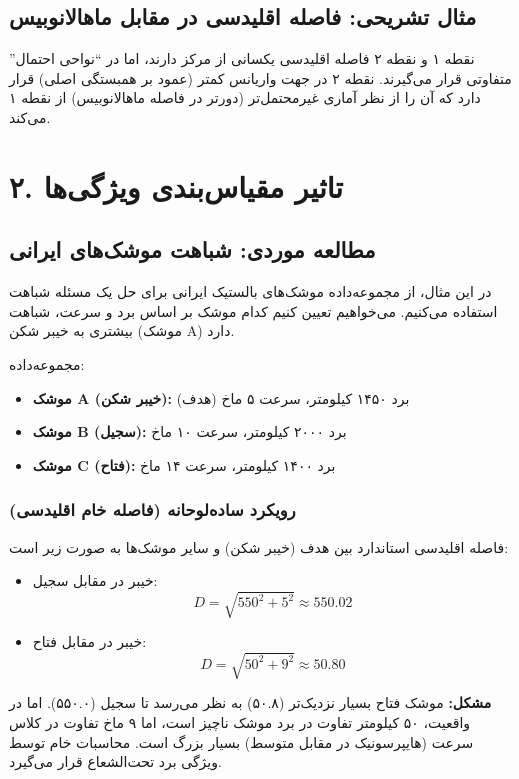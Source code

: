 \documentclass{article}
\begin{document}
\subsection*{مثال تشریحی: فاصله اقلیدسی در مقابل ماهالانوبیس}
نقطه ۱ و نقطه ۲ فاصله اقلیدسی یکسانی از مرکز دارند، اما در ``نواحی احتمال'' متفاوتی قرار می‌گیرند. نقطه ۲ در جهت واریانس کمتر (عمود بر همبستگی اصلی) قرار دارد که آن را از نظر آماری غیرمحتمل‌تر (دورتر در فاصله ماهالانوبیس) از نقطه ۱ می‌کند.

\section*{۲. تاثیر مقیاس‌بندی ویژگی‌ها}
\subsection*{مطالعه موردی: شباهت موشک‌های ایرانی}
در این مثال، از مجموعه‌داده موشک‌های بالستیک ایرانی برای حل یک مسئله شباهت استفاده می‌کنیم. می‌خواهیم تعیین کنیم کدام موشک بر اساس برد و سرعت، شباهت بیشتری به خیبر شکن (موشک A) دارد.

مجموعه‌داده:
\begin{itemize}
    \item \textbf{موشک A (خیبر شکن):} برد ۱۴۵۰ کیلومتر، سرعت ۵ ماخ (هدف)
    \item \textbf{موشک B (سجیل):} برد ۲۰۰۰ کیلومتر، سرعت ۱۰ ماخ
    \item \textbf{موشک C (فتاح):} برد ۱۴۰۰ کیلومتر، سرعت ۱۴ ماخ
\end{itemize}

\subsubsection*{رویکرد ساده‌لوحانه (فاصله خام اقلیدسی)}
فاصله اقلیدسی استاندارد بین هدف (خیبر شکن) و سایر موشک‌ها به صورت زیر است:
\begin{itemize}
    \item خیبر در مقابل سجیل:
    \[
    D = \sqrt{550^2 + 5^2} \approx 550.02
    \]
    \item خیبر در مقابل فتاح:
    \[
    D = \sqrt{50^2 + 9^2} \approx 50.80
    \]
\end{itemize}
\textbf{مشکل:} موشک فتاح بسیار نزدیک‌تر (۵۰.۸) به نظر می‌رسد تا سجیل (۵۵۰.۰). اما در واقعیت، ۵۰ کیلومتر تفاوت در برد موشک ناچیز است، اما ۹ ماخ تفاوت در کلاس سرعت (هایپرسونیک در مقابل متوسط) بسیار بزرگ است. محاسبات خام توسط ویژگی برد تحت‌الشعاع قرار می‌گیرد.
\end{document}
